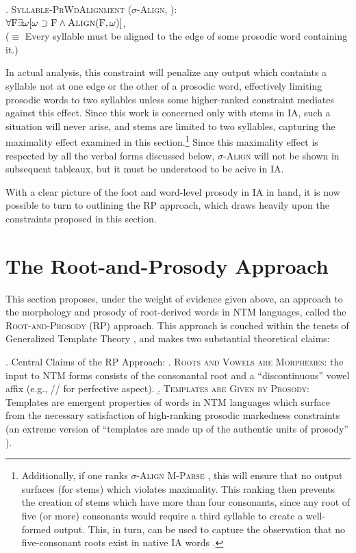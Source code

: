 \documentclass[12pt,twoside,letterpaper]{article}
\begin{document}
\ex. \textsc{Syllable-PrWdAlignment} ($\sigma$-\textsc{Align}, \cite[p. 188]{ussishkin05}):\\$\forall \textrm{F} \exists \omega [\omega \supset \textrm{F} \wedge \textsc{Align}(\textrm{F}, \omega)]$,\\($\equiv$ Every syllable must be aligned to the edge of some prosodic word containing it.)

In actual analysis, this constraint will penalize any output which containts a syllable not at one edge or the other of a prosodic word, effectively limiting prosodic words to two syllables unless some higher-ranked constraint mediates against this effect. Since this work is concerned only with stems in IA, such a situation will never arise, and stems are limited to two syllables, capturing the maximality effect examined in this section.\footnote{Additionally, if one ranks $\sigma$-\textsc{Align} \OTdom \textsc{M-Parse} \citep{prince04}, this will ensure that no output surfaces (for stems) which violates maximality. This ranking then prevents the creation of stems which have more than four consonants, since any root of five (or more) consonants would require a third syllable to create a well-formed output. This, in turn, can be used to capture the observation that no five-consonant roots exist in native IA words \citep{erwin04}.} Since this maximality effect is respected by all the verbal forms discussed below, $\sigma$-\textsc{Align} will not be shown in subsequent tableaux, but it must be understood to be acive in IA.

With a clear picture of the foot and word-level prosody in IA in hand, it is now possible to turn to outlining the RP approach, which draws heavily upon the constraints proposed in this section.

\section{The Root-and-Prosody Approach}
\label{sec:root-pros-appr}

This section proposes, under the weight of evidence given above, an approach to the morphology and prosody of root-derived words in NTM languages, called the \textsc{Root-and-Prosody} (RP) approach. This approach is couched within the tenets of Generalized Template Theory \citep{mccarthy95}, and makes two substantial theoretical claims:

\ex. Central Claims of the RP Approach:
\a. \textsc{Roots and Vowels are Morphemes}: the input to NTM forms consists of the consonantal root and a ``discontinuous'' vowel affix (e.g., // for perfective aspect).
\b. \textsc{Templates are Given by Prosody}: Templates are emergent properties of words in NTM languages which surface from the necessary satisfaction of high-ranking prosodic markedness constraints (an extreme version of ``templates are made up of the authentic units of prosody'' \citep{mccarthy86}).
\end{document}
